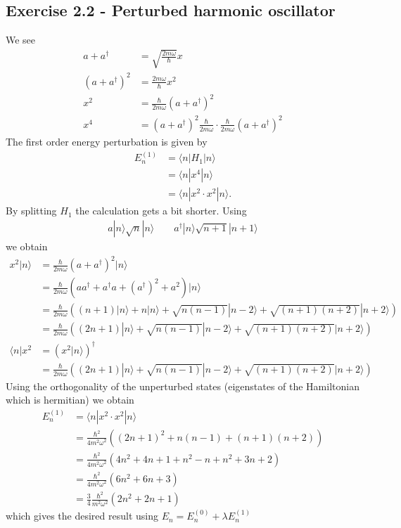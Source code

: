 \documentclass[../main.tex]{subfiles}
\begin{document}
\subsection*{Exercise 2.2 - Perturbed harmonic oscillator}
We see
\begin{align}
a+a^\dagger&=\sqrt{\frac{2m\omega}{\hbar}}x\\
(a+a^\dagger)^2&=\frac{2m\omega}{\hbar}x^2\\
x^2&=\frac{\hbar}{2m\omega}(a+a^\dagger)^2\\
x^4&=(a+a^\dagger)^2\frac{\hbar}{2m\omega}\cdot\frac{\hbar}{2m\omega}(a+a^\dagger)^2
\end{align}
The first order energy perturbation is given by
\begin{align}
E^{(1)}_n
&=\langle n|H_1|n \rangle\\
&=\langle n|x^4|n \rangle\\
&=\langle n|x^2\cdot x^2|n \rangle.
\end{align}
By splitting $H_1$ the calculation gets a bit shorter. Using
\begin{align}
a|n\rangle\sqrt{n}|n\rangle \qquad a^\dagger|n\rangle\sqrt{n+1}|n+1\rangle
\end{align}
we obtain
\begin{align}
x^2|n \rangle
&=\frac{\hbar}{2m\omega}(a+a^\dagger)^2|n \rangle\\
&=\frac{\hbar}{2m\omega}(aa^\dagger+a^\dagger a+(a^\dagger)^2+a^2)|n \rangle\\
&=\frac{\hbar}{2m\omega}\left((n+1)|n\rangle +n|n\rangle+\sqrt{n(n-1)}|n-2\rangle+\sqrt{(n+1)(n+2)}|n+2\rangle\right)\\
&=\frac{\hbar}{2m\omega}\left((2n+1)|n\rangle +\sqrt{n(n-1)}|n-2\rangle+\sqrt{(n+1)(n+2)}|n+2\rangle\right)\\
\langle n|x^2&=(x^2|n \rangle)^\dagger\\
&=\frac{\hbar}{2m\omega}\left((2n+1)|n\rangle +\sqrt{n(n-1)}|n-2\rangle+\sqrt{(n+1)(n+2)}|n+2\rangle\right)
\end{align}
Using the orthogonality of the unperturbed states (eigenstates of the Hamiltonian which is hermitian) we obtain
\begin{align}
E^{(1)}_n
&=\langle n|x^2\cdot x^2|n \rangle\\
&=\frac{\hbar^2}{4m^2\omega^2}\left((2n+1)^2+n(n-1)+(n+1)(n+2)\right)\\
&=\frac{\hbar^2}{4m^2\omega^2}\left(4n^2+4n+1+n^2-n+n^2+3n+2\right)\\
&=\frac{\hbar^2}{4m^2\omega^2}\left(6n^2+6n+3\right)\\
&=\frac{3}{4}\frac{\hbar^2}{m^2\omega^2}\left(2n^2+2n+1\right)
\end{align}
which gives the desired result using $E_n=E_n^{(0)}+\lambda E_n^{(1)}$
\end{document}

